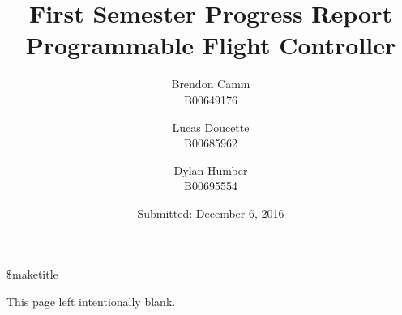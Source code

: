 \documentclass[12pt, twoside, letterpaper,titlepage]{article}
\title{First Semester Progress Report \\ Programmable Flight Controller}
\author{Brendon Camm \\ B00649176 \and Lucas Doucette \\ B00685962 \and Dylan Humber \\ B00695554}
\date{Submitted: December 6, 2016}
\begin{document}
	\$maketitle
	\newpage
	\begin{center}
		This page left intentionally blank.
	\end{center}

	\newpage
	\begin{abstract} %
	\end{abstract}
	\setcounter{tocdepth}{2}
	\tableofcontents
	\pagebreak
	
	
	
	
	
	
	
	
	
	
	\appendix
	
	
	
	
	
\end{document}
